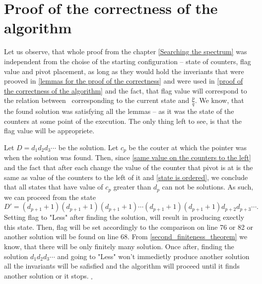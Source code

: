 \section{Proof of the correctness of the algorithm}
Let us observe, that whole proof from the chapter \ref{Searching the spectrum} 
was independent from the choise of 
the starting configuration -- state of counters, flag value and pivot placement, as 
long as they would hold the inveriants that were prooved in 
\ref{lemmas for the proof of the correctness} and were used in 
\ref{proof of the correctness of the algorithm} and the fact, that flag value will 
correspond to the relation between \Eoc\ corresponding to the current state and $\frac{p}{q}$. 
We know, that the found solution was satisfying all the lemmas -- as it was the state of 
the counters at some point of the execution. The only thing left to see, is that 
the flag value will be appropriete. 

Let $D = d_1d_2d_3\cdots$ be the solution. 
Let $c_p$ be the couter at which the pointer was when the solution was found. Then, since 
\ref{same value on the counters to the left} and the fact that after each change the value of 
the counter that pivot is at is the same as value of the counters to the left of it 
and \ref{state is ordered}, we conclude 
that 
all states that have value of $c_p$ greater than $d_p$ can not be solutions. 
As such, we can proceed from the state 
\begin{equation}
D' = (d_{p+1}+1)(d_{p+1}+1)(d_{p+1}+1)\cdots (d_{p+1}+1)(d_{p+1}+1)d_{p+2}d_{p+3}\cdots.
\end{equation}
Setting flag to "Less" after finding the solution, will result in producing exectly this state. 
Then, flag will be set accordingly to the comparison on line 76 or 82 or another solution will 
be found on line 68. 
From \ref{second_finiteness_theorem} we know, that there will be only finitely many 
solution. 
Once after, finding the solution $d_1d_2d_3\cdots$ and going to "Less" won't immedietly produce 
another solution 
all the invariants will be safisfied and the algorithm will proceed 
until it finds another solution or it stops. 
$_\square$

